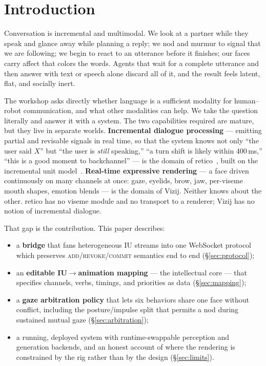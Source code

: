 \documentclass[conference]{IEEEtran}
\begin{document}
\section{Introduction}

Conversation is incremental and multimodal. We look at a partner while they speak
and glance away while planning a reply; we nod and murmur to signal that we are
following; we begin to react to an utterance before it finishes; our faces carry
affect that colors the words. Agents that wait for a complete utterance and then
answer with text or speech alone discard all of it, and the result feels latent,
flat, and socially inert.

The workshop asks directly whether language is a sufficient modality for
human--robot communication, and what other modalities can help. We take the
question literally and answer it with a system. The two capabilities required are
mature, but they live in separate worlds. \textbf{Incremental dialogue
processing} --- emitting partial and revisable signals in real time, so that the
system knows not only ``the user said $X$'' but ``the user is \emph{still}
speaking,'' ``a turn shift is likely within 400\,ms,'' ``this is a good moment to
backchannel'' --- is the domain of retico~\cite{michael2020retico}, built on the
incremental unit model~\cite{schlangen2011iu}. \textbf{Real-time expressive
rendering} --- a face driven continuously on many channels at once: gaze, eyelids,
brow, jaw, per-viseme mouth shapes, emotion blends --- is the domain of Vizij.
Neither knows about the other. retico has no viseme module and no transport to a
renderer; Vizij has no notion of incremental dialogue.

That gap is the contribution. This paper describes:

\begin{itemize}
  \item a \textbf{bridge} that fans heterogeneous IU streams into one WebSocket
        protocol which preserves \textsc{add}/\textsc{revoke}/\textsc{commit}
        semantics end to end (\S\ref{sec:protocol});
  \item an \textbf{editable IU$\rightarrow$animation mapping} --- the intellectual
        core --- that specifies channels, verbs, timings, and priorities as data
        (\S\ref{sec:mapping});
  \item a \textbf{gaze arbitration policy} that lets six behaviors share one face
        without conflict, including the posture/impulse split that permits a nod
        during sustained mutual gaze (\S\ref{sec:arbitration});
  \item a running, deployed system with runtime-swappable perception and
        generation backends, and an honest account of where the rendering is
        constrained by the rig rather than by the design (\S\ref{sec:limits}).
\end{itemize}
\end{document}
